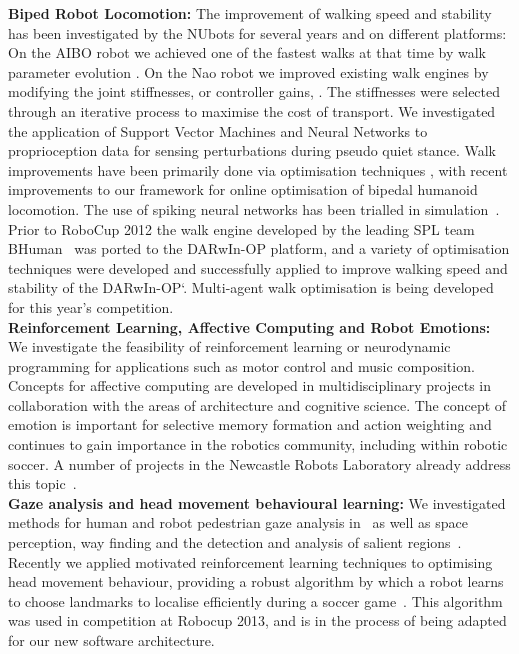 \documentclass{llncs}
\begin{document}
\noindent\textbf{Biped Robot Locomotion:} The improvement of walking speed and stability has been investigated by the NUbots for several years and on different platforms: On the AIBO robot we achieved one of the fastest walks at that time by walk parameter evolution \cite{QuinlanEtAlACRA2003,ChalupEtAlSMC2007}. On the Nao robot we improved existing walk engines by modifying the joint stiffnesses, or controller gains, \cite{Kulk2008,Kulk2010,Kulk2010a}. The stiffnesses were selected through an iterative process to maximise the cost of transport. We investigated the application of Support Vector Machines and Neural Networks to proprioception data for sensing perturbations during pseudo quiet stance. Walk improvements have been primarily done via optimisation techniques \cite{Kulk2011a},  %
with recent improvements to our framework for online optimisation of bipedal humanoid locomotion.
The use of spiking neural networks has been trialled in simulation~\cite{WiklendtChalup2008}. Prior to RoboCup 2012 the walk engine developed by the leading SPL team BHuman~\cite{BHumanWalk2010} was ported to the DARwIn-OP platform, and a variety of optimisation techniques were developed and successfully applied to improve walking speed and stability of the DARwIn-OP`\cite{budden2013probabilistic}. Multi-agent walk optimisation is being developed for this year's competition.\\

\noindent\textbf{Reinforcement Learning, Affective Computing and Robot Emotions:} We investigate the feasibility of reinforcement learning or neurodynamic programming for applications such as motor control and music composition. Concepts for affective computing are developed in multidisciplinary projects in collaboration with the areas of architecture and cognitive science. The concept of emotion is important for selective memory formation and action weighting and continues to gain importance in the robotics community, including within robotic soccer. A number of projects in the Newcastle Robots Laboratory already address this topic~\cite{Pareidolia2010,HongEtAl2013a,HongEtAl2013b,WongEtAl2013}.
\\

\noindent\textbf{Gaze analysis and head movement behavioural learning:} We investigated methods for human and robot pedestrian gaze analysis in~\cite{JalalianEtAl_CAADRIA2011,WongEtAl2012} as well as space perception, way finding and the detection and analysis of salient regions~\cite{BhatiaChalup2013,BhatiaEtAl2013,BhatiaChalupOstwald2013}. Recently we  applied motivated reinforcement learning techniques to optimising head movement behaviour, providing a robust algorithm by which a robot learns to choose landmarks to localise efficiently during a soccer game~\cite{FountainEtAl2014}. This algorithm was used in competition at Robocup 2013, and is in the process of being adapted for our new software architecture.
\\
\end{document}
